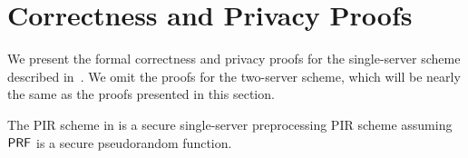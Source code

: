 \section{Correctness and Privacy Proofs}

We present the formal correctness and privacy proofs for the single-server scheme described in~.
We omit the proofs for the two-server scheme, which will be nearly the same as the proofs presented in this section.

\label{sec:proof}

\begin{theorem}[Privacy]
    The PIR scheme in  is a secure single-server preprocessing PIR scheme assuming $\mathsf{PRF}$ is a secure pseudorandom function.
    \label{thm:privacy}
\end{theorem}

